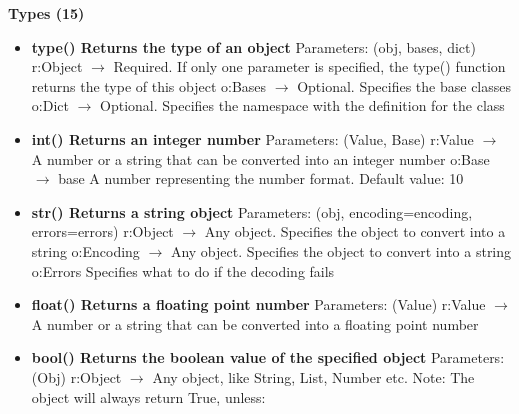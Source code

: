 \documentclass{report}
\begin{document}
      \begin{center}
        \textbf{Types (15)}
      \end{center}
      \begin{itemize}
        \item[\ding{43}] \textbf{type()	Returns the type of an object}
          \smallbreak \noindent
          Parameters: (obj, bases, dict)
          \smallbreak \noindent
          r:Object $\rightarrow$ Required. If only one parameter is specified, the type() function returns the type of this object
          \smallbreak \noindent
          o:Bases $\rightarrow$ Optional. Specifies the base classes
          \smallbreak \noindent
          o:Dict $\rightarrow$ Optional. Specifies the namespace with the definition for the class
          \smallbreak \noindent
        \item[\ding{43}] \textbf{int() Returns an integer number}
          \smallbreak \noindent
          Parameters: (Value, Base)
          \smallbreak \noindent
          r:Value $\rightarrow$ 	A number or a string that can be converted into an integer number
          \smallbreak \noindent
          o:Base $\rightarrow$ base	A number representing the number format. Default value: 10
          \smallbreak \noindent
        \item[\ding{43}] \textbf{str()	Returns a string object}
          \smallbreak \noindent
          Parameters: (obj, encoding=encoding, errors=errors)
          \smallbreak \noindent
          r:Object $\rightarrow$ 	Any object. Specifies the object to convert into a string
          \smallbreak \noindent
          o:Encoding $\rightarrow$ 	Any object. Specifies the object to convert into a string
          \smallbreak \noindent
          o:Errors	Specifies what to do if the decoding fails
          \smallbreak \noindent
        \item[\ding{43}] \textbf{float() Returns a floating point number}
          \smallbreak \noindent
          Parameters: (Value)
          \smallbreak \noindent
          r:Value $\rightarrow$ A number or a string that can be converted into a floating point number
          \smallbreak \noindent
        \item[\ding{43}] \textbf{bool()	Returns the boolean value of the specified object}
          \smallbreak \noindent
          Parameters: (Obj)
          \smallbreak \noindent
          r:Object $\rightarrow$ Any object, like String, List, Number etc.
          \smallbreak \noindent
          Note: The object will always return True, unless: \\

\end{itemize}
\end{document}

